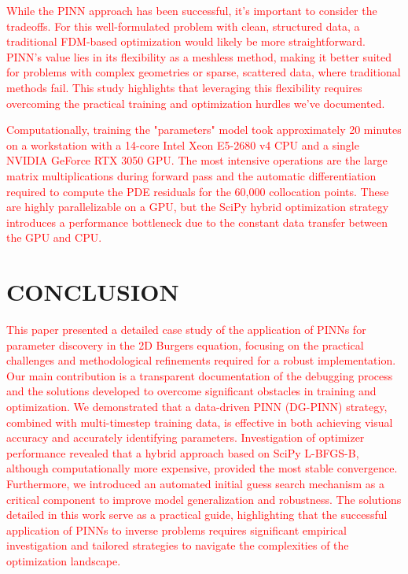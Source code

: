 \documentclass[12pt,fleqn]{article}
\begin{document}
\textcolor{red}{While the PINN approach has been successful, it's important to consider the tradeoffs. For this well-formulated problem with clean, structured data, a traditional FDM-based optimization would likely be more straightforward. PINN's value lies in its flexibility as a meshless method, making it better suited for problems with complex geometries or sparse, scattered data, where traditional methods fail. This study highlights that leveraging this flexibility requires overcoming the practical training and optimization hurdles we've documented.}

\textcolor{red}{Computationally, training the "parameters" model took approximately 20 minutes on a workstation with a 14-core Intel Xeon E5-2680 v4 CPU and a single NVIDIA GeForce RTX 3050 GPU. The most intensive operations are the large matrix multiplications during forward pass and the automatic differentiation required to compute the PDE residuals for the 60,000 collocation points. These are highly parallelizable on a GPU, but the SciPy hybrid optimization strategy introduces a performance bottleneck due to the constant data transfer between the GPU and CPU.
}









\section{CONCLUSION}

\textcolor{red}{This paper presented a detailed case study of the application of PINNs for parameter discovery in the 2D Burgers equation, focusing on the practical challenges and methodological refinements required for a robust implementation. Our main contribution is a transparent documentation of the debugging process and the solutions developed to overcome significant obstacles in training and optimization. We demonstrated that a data-driven PINN (DG-PINN) strategy, combined with multi-timestep training data, is effective in both achieving visual accuracy and accurately identifying parameters. Investigation of optimizer performance revealed that a hybrid approach based on SciPy L-BFGS-B, although computationally more expensive, provided the most stable convergence. Furthermore, we introduced an automated initial guess search mechanism as a critical component to improve model generalization and robustness. The solutions detailed in this work serve as a practical guide, highlighting that the successful application of PINNs to inverse problems requires significant empirical investigation and tailored strategies to navigate the complexities of the optimization landscape.}
\end{document}
